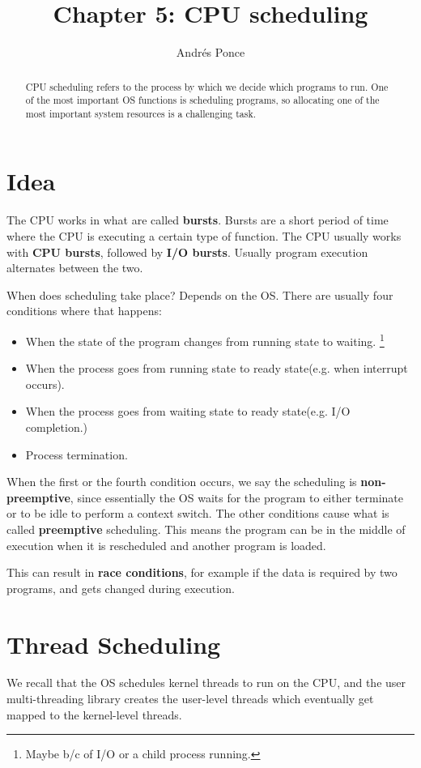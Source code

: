 \documentclass{tufte-handout}
\title{Chapter 5: CPU scheduling}
\author{Andr\'es Ponce}
\begin{document}
\maketitle
\begin{abstract}
CPU scheduling refers to the process by which we decide which
programs to run. One of the most important OS functions is scheduling
programs, so allocating one of the most important system resources
is a challenging task. 
\end{abstract}

\section{Idea}
The CPU works in what are called \textbf{bursts}. Bursts are a short period of time
where the CPU is executing a certain type of function. The CPU usually works with 
\textbf{CPU bursts}, followed by \textbf{I/O bursts}. Usually program execution alternates
between the two.

When does scheduling take place? Depends on the OS. There are usually four conditions where
that happens:
\begin{itemize}
	\item When the state of the program changes from running state to waiting.
	\footnote{Maybe b/c of I/O or a child process running.}
	\item When the process goes from running state to ready state(e.g. when interrupt occurs).
	\item When the process goes from waiting state to ready state(e.g. I/O completion.)
	\item Process termination.
\end{itemize}

When the first or the fourth condition occurs, we say the scheduling is \textbf{non-preemptive},
since essentially the OS waits for the program to either terminate or to be idle to perform 
a context switch. The other conditions cause what is called \textbf{preemptive} scheduling. 
This means the program can be in the middle of execution when it is rescheduled and another
program is loaded.

This can result in \textbf{race conditions}, for example if the data is required by two
programs, and gets changed during execution.

\section{Thread Scheduling}
We recall that the OS schedules kernel threads to run on the CPU, and the user 
multi-threading library creates the user-level threads which eventually get
mapped to the kernel-level threads.
\end{document}
